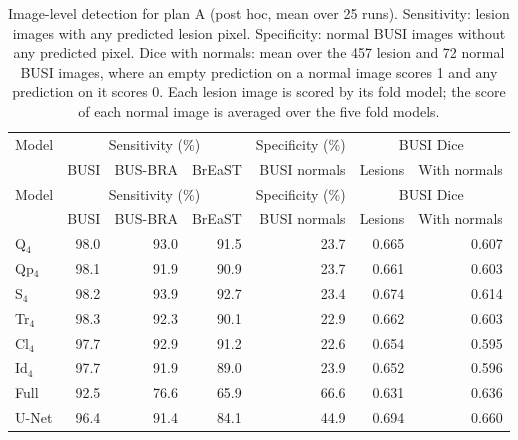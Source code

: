 \begin{longtable}{@{}lrrrrrr@{}}
\caption{Image-level detection for plan A (post hoc, mean over 25 runs). Sensitivity: lesion images with any predicted lesion pixel. Specificity: normal BUSI images without any predicted pixel. Dice with normals: mean over the 457 lesion and 72 normal BUSI images, where an empty prediction on a normal image scores 1 and any prediction on it scores 0. Each lesion image is scored by its fold model; the score of each normal image is averaged over the five fold models.}\label{stab:detect}\\
\toprule
Model & \multicolumn{3}{c}{Sensitivity (\%)} & Specificity (\%) & \multicolumn{2}{c}{BUSI Dice} \\ & BUSI & BUS-BRA & BrEaST & BUSI normals & Lesions & With normals \\
\midrule
\endfirsthead
\toprule
Model & \multicolumn{3}{c}{Sensitivity (\%)} & Specificity (\%) & \multicolumn{2}{c}{BUSI Dice} \\ & BUSI & BUS-BRA & BrEaST & BUSI normals & Lesions & With normals \\
\midrule
\endhead
Q$_4$ & 98.0 & 93.0 & 91.5 & 23.7 & 0.665 & 0.607 \\
Qp$_4$ & 98.1 & 91.9 & 90.9 & 23.7 & 0.661 & 0.603 \\
S$_4$ & 98.2 & 93.9 & 92.7 & 23.4 & 0.674 & 0.614 \\
Tr$_4$ & 98.3 & 92.3 & 90.1 & 22.9 & 0.662 & 0.603 \\
Cl$_4$ & 97.7 & 92.9 & 91.2 & 22.6 & 0.654 & 0.595 \\
Id$_4$ & 97.7 & 91.9 & 89.0 & 23.9 & 0.652 & 0.596 \\
Full & 92.5 & 76.6 & 65.9 & 66.6 & 0.631 & 0.636 \\
U-Net & 96.4 & 91.4 & 84.1 & 44.9 & 0.694 & 0.660 \\
\bottomrule
\end{longtable}
